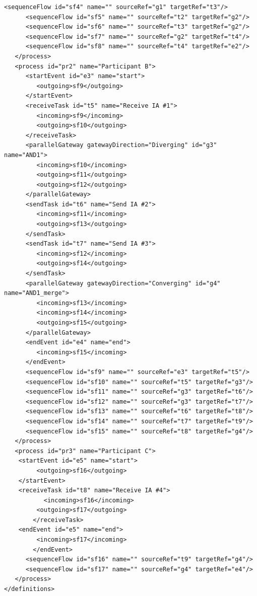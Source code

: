 \begin{lstlisting}[caption={BPMN Choreography Model Example},captionpos=b, label={lst:collabbpmnex}]
      <sequenceFlow id="sf4" name="" sourceRef="g1" targetRef="t3"/>
      <sequenceFlow id="sf5" name="" sourceRef="t2" targetRef="g2"/>
      <sequenceFlow id="sf6" name="" sourceRef="t3" targetRef="g2"/>
      <sequenceFlow id="sf7" name="" sourceRef="g2" targetRef="t4"/>
      <sequenceFlow id="sf8" name="" sourceRef="t4" targetRef="e2"/>
   </process>
   <process id="pr2" name="Participant B">
      <startEvent id="e3" name="start">
         <outgoing>sf9</outgoing>
      </startEvent>
      <receiveTask id="t5" name="Receive IA #1">
         <incoming>sf9</incoming>
         <outgoing>sf10</outgoing>
      </receiveTask>
      <parallelGateway gatewayDirection="Diverging" id="g3" name="AND1">
         <incoming>sf10</incoming>
         <outgoing>sf11</outgoing>
         <outgoing>sf12</outgoing>
      </parallelGateway>
      <sendTask id="t6" name="Send IA #2">
         <incoming>sf11</incoming>
         <outgoing>sf13</outgoing>
      </sendTask>
      <sendTask id="t7" name="Send IA #3">
         <incoming>sf12</incoming>
         <outgoing>sf14</outgoing>
      </sendTask>
      <parallelGateway gatewayDirection="Converging" id="g4" name="AND1_merge">
         <incoming>sf13</incoming>
         <incoming>sf14</incoming>
         <outgoing>sf15</outgoing>
      </parallelGateway>
      <endEvent id="e4" name="end">
         <incoming>sf15</incoming>
      </endEvent>
      <sequenceFlow id="sf9" name="" sourceRef="e3" targetRef="t5"/>
      <sequenceFlow id="sf10" name="" sourceRef="t5" targetRef="g3"/>
      <sequenceFlow id="sf11" name="" sourceRef="g3" targetRef="t6"/>
      <sequenceFlow id="sf12" name="" sourceRef="g3" targetRef="t7"/>
      <sequenceFlow id="sf13" name="" sourceRef="t6" targetRef="t8"/>
      <sequenceFlow id="sf14" name="" sourceRef="t7" targetRef="t9"/>
      <sequenceFlow id="sf15" name="" sourceRef="t8" targetRef="g4"/>
   </process>
   <process id="pr3" name="Participant C">
   	<startEvent id="e5" name="start">
         <outgoing>sf16</outgoing>
   	</startEvent>
   	<receiveTask id="t8" name="Receive IA #4">
     	   <incoming>sf16</incoming>
         <outgoing>sf17</outgoing>
     	</receiveTask>
   	<endEvent id="e5" name="end">
         <incoming>sf17</incoming>
     	</endEvent>
      <sequenceFlow id="sf16" name="" sourceRef="t9" targetRef="g4"/>
      <sequenceFlow id="sf17" name="" sourceRef="g4" targetRef="e4"/>
   </process>
</definitions>
\end{lstlisting}

